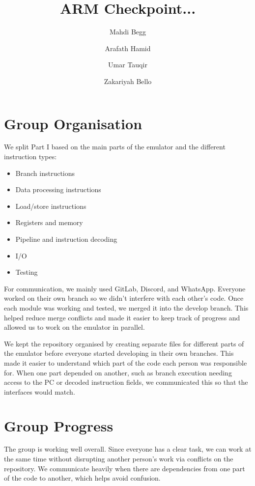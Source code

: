 \documentclass[11pt]{article}
\begin{document}
\title{ARM Checkpoint... }
\author{Mahdi Begg\and Arafath Hamid\and Umar Tauqir\and Zakariyah Bello}

\maketitle

\section{Group Organisation}

We split Part I based on the main parts of the emulator and the different instruction types:

\begin{itemize}
    \item Branch instructions
    \item Data processing instructions
    \item Load/store instructions
    \item Registers and memory
    \item Pipeline and instruction decoding
    \item I/O
    \item Testing
\end{itemize}

For communication, we mainly used GitLab, Discord, and WhatsApp. Everyone worked on their own branch so we didn’t interfere with each other’s code. Once each module was working and tested, we merged it into the develop branch. This helped reduce merge conflicts and made it easier to keep track of progress and allowed us to work on the emulator in parallel.

We kept the repository organised by creating separate files for different parts of the emulator before everyone started developing in their own branches. This made it easier to understand which part of the code each person was responsible for. When one part depended on another, such as branch execution needing access to the PC or decoded instruction fields, we communicated this so that the interfaces would match.

\section{Group Progress}

The group is working well overall. Since everyone has a clear task, we can work at the same time without disrupting another person's work via conflicts on the repository. We communicate heavily when there are dependencies from one part of the code to another, which helps avoid confusion.
\end{document}
